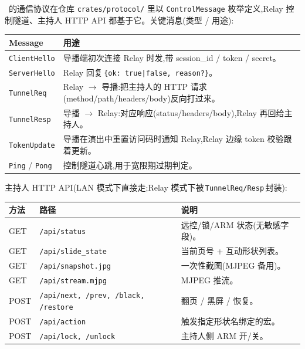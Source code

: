 \app\ 的通信协议在仓库 \texttt{crates/protocol/} 里以 \texttt{ControlMessage} 枚举定义,Relay 控制隧道、主持人 HTTP API 都基于它。关键消息(类型 / 用途):

\begin{center}\small
\begin{tabularx}{\linewidth}{l X}
\toprule
\textbf{Message} & \textbf{用途}\\
\midrule
\texttt{ClientHello}        & 导播端初次连接 Relay 时发,带 session\_id / token / secret。\\
\texttt{ServerHello}        & Relay 回复\,\texttt{\{ok: true|false, reason?\}}。\\
\texttt{TunnelReq}          & Relay $\to$ 导播:把主持人的 HTTP 请求(method/path/headers/body)反向打过来。\\
\texttt{TunnelResp}         & 导播 $\to$ Relay:对应响应(status/headers/body),Relay 再回给主持人。\\
\texttt{TokenUpdate}        & 导播在演出中重置访问码时通知 Relay,Relay 边缘 token 校验跟着更新。\\
\texttt{Ping} / \texttt{Pong} & 控制隧道心跳,用于宽限期过期判定。\\
\bottomrule
\end{tabularx}
\end{center}

主持人 HTTP API(LAN 模式下直接走;Relay 模式下被\,\texttt{TunnelReq/Resp}\,封装):

\begin{center}\small
\begin{tabularx}{\linewidth}{l l X}
\toprule
\textbf{方法} & \textbf{路径} & \textbf{说明}\\
\midrule
GET  & \texttt{/api/status}        & 远控/锁/ARM 状态(无敏感字段)。\\
GET  & \texttt{/api/slide\_state}  & 当前页号 + 互动形状列表。\\
GET  & \texttt{/api/snapshot.jpg}  & 一次性截图(MJPEG 备用)。\\
GET  & \texttt{/api/stream.mjpg}   & MJPEG 推流。\\
POST & \texttt{/api/next, /prev, /black, /restore} & 翻页 / 黑屏 / 恢复。\\
POST & \texttt{/api/action}        & 触发指定形状名绑定的宏。\\
POST & \texttt{/api/lock, /unlock} & 主持人侧 ARM 开/关。\\
\bottomrule
\end{tabularx}
\end{center}

